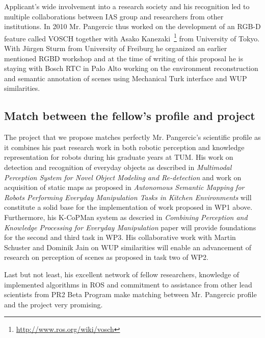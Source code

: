 Applicant's wide involvement into a research society and his recognition led to multiple collaborations
between IAS group and researchers from other institutions. In 2010 Mr. Pangercic
thus worked on the development of an RGB-D feature called VOSCH together with
Asako Kanezaki~\footnote{\url{http://www.ros.org/wiki/vosch}} from University of Tokyo.
With J\"urgen Sturm from University of Freiburg he organized an earlier mentioned
RGBD workshop and at the time of writing of this proposal he is staying with Bosch RTC
in Palo Alto working on the environment reconstruction and semantic annotation
of scenes using Mechanical Turk interface and WUP similarities.
\subsection{Match between the fellow's profile and project}
The project that we propose matches perfectly Mr. Pangercic's scientific profile as it combines
his past research work in both robotic perception and knowledge representation for robots
during his graduate years at TUM. His work on detection and recognition of everyday objects as
described in \emph{Multimodal Perception System for Novel Object Modeling and Re-detection}
and work on acquisition of static maps as proposed in \emph{Autonomous Semantic Mapping for Robots Performing  
Everyday Manipulation Tasks in Kitchen Environments} will constitute a solid base for the
implementation of work proposed in WP1 above. Furthermore, his K-CoPMan system as descried in
\emph{Combining Perception and Knowledge Processing for Everyday Manipulation} paper will
provide foundations for the second and third task in WP3. His collaborative work with Martin Schuster
and Dominik Jain on WUP similarities will enable an advancement of research on perception
of scenes as proposed in task two of WP2.

Last but not least, his excellent network of fellow researchers, knowledge of implemented algorithms
in ROS and commitment to assistance from other lead scientists from PR2 Beta Program make
matching between Mr. Pangercic profile and the project very promising.

